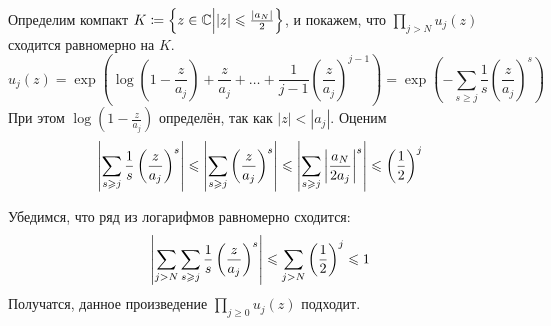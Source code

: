 \documentclass[a4paper]{report}
\begin{document}
{{            Определим компакт $K \coloneqq \left\{z \in \mathbb{C}\middle||z| \leqslant \frac{|a_N|}{2}\right\}$, и покажем, что $\prod\limits_{j > N}u_j(z)$ сходится равномерно на $K$.
            \[u_j(z) = \exp\left(\log\left(1 - \frac{z}{a_j}\right) + \frac{z}{a_j} + \dots + \frac{1}{j - 1}\left(\frac{z}{a_j}\right)^{j - 1}\right) = \exp\left(-\sum\limits_{s \ge j}\frac{1}{s}\left(\frac{z}{a_j}\right)^s\right)\]
            При этом $\log\left(1 - \frac{z}{a_j}\right)$ определён, так как $|z| < |a_j|$. Оценим
            \[\left|\sum\limits_{s \geqslant j}\frac{1}{s}\left(\frac{z}{a_j}\right)^s\right| \leqslant \left|\sum\limits_{s \geqslant j}\left(\frac{z}{a_j}\right)^s\right|\leqslant \left|\sum\limits_{s \geqslant j}\left|\frac{a_N}{2a_j}\right|^s\right| \leqslant \left(\frac{1}{2}\right)^j\]

            Убедимся, что ряд из логарифмов равномерно сходится:
            \[\left|\sum\limits_{j > N}\sum\limits_{s \geqslant j}\frac{1}{s}\left(\frac{z}{a_j}\right)^s\right| \leqslant \sum\limits_{j > N}\left(\frac{1}{2}\right)^j \leqslant 1\]
            Получатся, данное произведение $\prod\limits_{j \ge 0}u_j(z)$ подходит.
        }
    }
\end{document}
